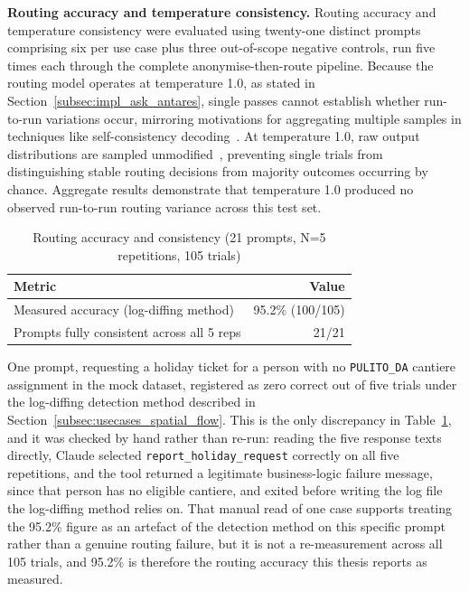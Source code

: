 \textbf{Routing accuracy and temperature consistency.} Routing accuracy and temperature consistency were evaluated using twenty-one distinct prompts comprising six per use case plus three out-of-scope negative controls, run five times each through the complete anonymise-then-route pipeline. Because the routing model operates at temperature 1.0, as stated in Section~\ref{subsec:impl_ask_antares}, single passes cannot establish whether run-to-run variations occur, mirroring motivations for aggregating multiple samples in techniques like self-consistency decoding~\cite{wang2022selfconsistency}. At temperature 1.0, raw output distributions are sampled unmodified~\cite{holtzman2020degeneration}, preventing single trials from distinguishing stable routing decisions from majority outcomes occurring by chance. Aggregate results demonstrate that temperature 1.0 produced no observed run-to-run routing variance across this test set.

\begin{table}[htbp]
\centering
\caption{Routing accuracy and consistency (21 prompts, N=5 repetitions, 105 trials)}
\label{tab:routing_summary}
\begin{tabular}{lr}
\hline
\textbf{Metric} & \textbf{Value} \\
\hline
Measured accuracy (log-diffing method) & 95.2\% (100/105) \\
Prompts fully consistent across all 5 reps & 21/21 \\
\hline
\end{tabular}
\end{table}

One prompt, requesting a holiday ticket for a person with no \texttt{PULITO\_DA} cantiere assignment in the mock dataset, registered as zero correct out of five trials under the log-diffing detection method described in Section~\ref{subsec:usecases_spatial_flow}. This is the only discrepancy in Table~\ref{tab:routing_summary}, and it was checked by hand rather than re-run: reading the five response texts directly, Claude selected \texttt{report\_holiday\_request} correctly on all five repetitions, and the tool returned a legitimate business-logic failure message, since that person has no eligible cantiere, and exited before writing the log file the log-diffing method relies on. That manual read of one case supports treating the 95.2\% figure as an artefact of the detection method on this specific prompt rather than a genuine routing failure, but it is not a re-measurement across all 105 trials, and 95.2\% is therefore the routing accuracy this thesis reports as measured.

